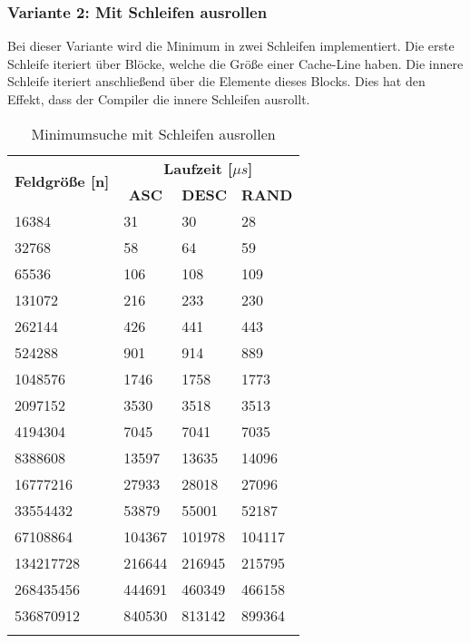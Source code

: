 \subsubsection{Variante 2: Mit Schleifen ausrollen}

Bei dieser Variante wird die Minimum in zwei Schleifen implementiert. Die erste Schleife iteriert über Blöcke, welche die Größe einer Cache-Line haben. Die innere Schleife iteriert anschließend über die Elemente dieses Blocks. Dies hat den Effekt, dass der Compiler die innere Schleifen ausrollt.
\begin{center}
	\begin{longtable}{|p{5cm}|p{3cm}|p{3cm}|p{3cm}|}
		\hline
		
		\multirow{2}{5cm}{\centering \textbf{Feldgröße [n]}} & \multicolumn{3}{|c|}{ \textbf{Laufzeit [$\mu s$]}} \\\cline{2-4}
		& \multicolumn{1}{|c|}{\textbf{ASC}} & \multicolumn{1}{|c|}{\textbf{DESC}} &\multicolumn{1}{|c|}{\textbf{RAND}} \\
		\hhline{|=|=|=|=|}
		
		16384 & 31 & 30 & 28\\
		\hline
		32768 & 58 & 64 & 59\\
		\hline
		65536 & 106 & 108 & 109\\
		\hline
		131072 & 216 & 233 & 230\\
		\hline
		262144 & 426 & 441 & 443\\
		\hline
		524288 & 901 & 914 & 889\\
		\hline
		1048576 & 1746 & 1758 & 1773\\
		\hline
		2097152 & 3530 & 3518 & 3513\\
		\hline
		4194304 & 7045 & 7041 & 7035\\
		\hline
		8388608 & 13597 & 13635 & 14096\\
		\hline
		16777216 & 27933 & 28018 & 27096\\
		\hline
		33554432 & 53879 & 55001 & 52187\\
		\hline
		67108864 & 104367 & 101978 & 104117\\
		\hline
		134217728 & 216644 & 216945 & 215795\\
		\hline
		268435456 & 444691 & 460349 & 466158\\
		\hline
		536870912 & 840530 & 813142 & 899364\\
		\hline
		
		\caption{Minimumsuche mit Schleifen ausrollen}
		\label{tab:minimumsearch-v2}
	\end{longtable}
\end{center}


